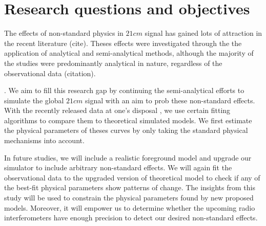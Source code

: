 \documentclass[12pt, TexShade, letterpaper]{report}
\begin{document}
\section{Research questions and objectives}
The effects of non-standard physics in $21cm$ signal has gained lots of attraction in the recent literature (cite). 
Theses effects were investigated through the the application of analytical and semi-analytical methods, although the majority of the studies were predominantly analytical in nature, regardless of the observational data (citation).\par {}.
We aim to fill this research gap by continuing the semi-analytical efforts to simulate the global $21cm$ signal with an aim to prob these non-standard effects. With the recently released data at one's disposal \cite{edges}, we use certain fitting algorithms to compare them to theoretical simulated models\cite{ares2014jordan}. We first estimate the physical parameters of theses curves by only taking the standard physical mechanisms into account.\par
In future studies, we will include a realistic foreground model and upgrade our simulator to include arbitrary non-standard effects. We will again fit the observational data to the upgraded version of theoretical model to check if any of the best-fit physical parameters show patterns of change. The insights from this study will be used to constrain the physical parameters found by new proposed models. Moreover, it will empower us to determine whether the upcoming radio interferometers have enough precision to detect our desired non-standard effects.\par
\end{document}
